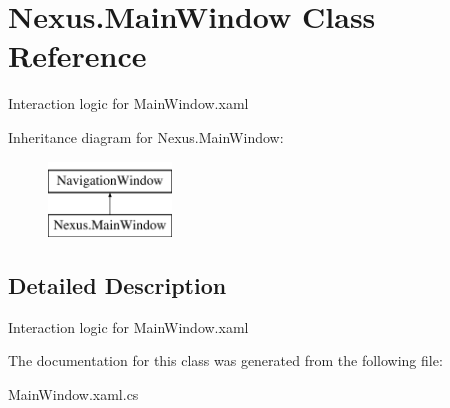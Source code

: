 \hypertarget{class_nexus_1_1_main_window}{}\section{Nexus.\+Main\+Window Class Reference}
\label{class_nexus_1_1_main_window}


Interaction logic for Main\+Window.\+xaml  


Inheritance diagram for Nexus.\+Main\+Window\+:\begin{figure}[H]
\begin{center}
\leavevmode
\includegraphics[height=2.000000cm]{class_nexus_1_1_main_window}
\end{center}
\end{figure}


\subsection{Detailed Description}
Interaction logic for Main\+Window.\+xaml 



The documentation for this class was generated from the following file\+:\begin{DoxyCompactItemize}
\item 
Main\+Window.\+xaml.\+cs\end{DoxyCompactItemize}
